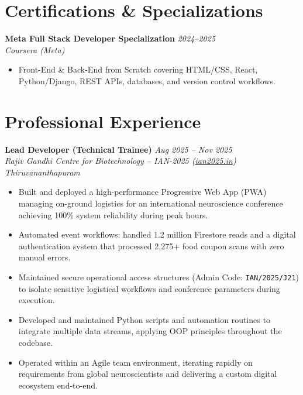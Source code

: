 \documentclass[10pt,a4paper]{article}
\newcommand{\jobheading}[4]{
  \noindent\textbf{#1} \hfill \textit{#2} \\
  \noindent\textit{#3} \hfill \textit{#4} \\
  \vspace{-4pt}
}
\begin{document}
\section*{Certifications \& Specializations}
\jobheading{Meta Full Stack Developer Specialization}{2024--2025}{Coursera (Meta)}{}
\begin{itemize}[label={$\bullet$}]
    \item Front-End \& Back-End from Scratch covering HTML/CSS, React, Python/Django, REST APIs, databases, and version control workflows.
\end{itemize}

\section*{Professional Experience}

\jobheading{Lead Developer (Technical Trainee)}{Aug 2025 -- Nov 2025}{Rajiv Gandhi Centre for Biotechnology -- IAN-2025 (\href{https://ian2025.in/}{ian2025.in})}{Thiruvananthapuram}
\begin{itemize}[label={$\bullet$}]
    \item Built and deployed a high-performance Progressive Web App (PWA) managing on-ground logistics for an international neuroscience conference achieving 100\% system reliability during peak hours.
    \item Automated event workflows: handled 1.2 million Firestore reads and a digital authentication system that processed 2,275+ food coupon scans with zero manual errors.
    \item Maintained secure operational access structures (Admin Code: \texttt{IAN/2025/J21}) to isolate sensitive logistical workflows and conference parameters during execution.
    \item Developed and maintained Python scripts and automation routines to integrate multiple data streams, applying OOP principles throughout the codebase.
    \item Operated within an Agile team environment, iterating rapidly on requirements from global neuroscientists and delivering a custom digital ecosystem end-to-end.
\end{itemize}

\vspace{5pt}
\end{document}

